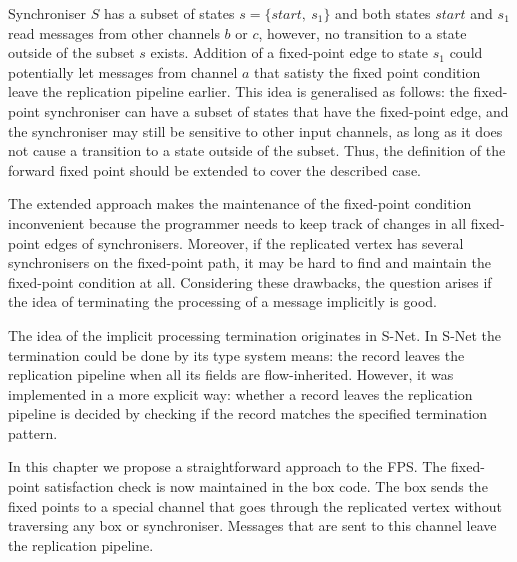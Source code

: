 Synchroniser $S$ has a subset of states $s=\{start, \: s_1\}$ and both states $start$ and $s_1$ read messages from other channels $b$ or $c$, however, no transition to a state outside of the subset $s$ exists. Addition of a fixed-point edge to state $s_1$ could potentially let messages from channel $a$ that satisty the fixed point condition leave the replication pipeline earlier. This idea is generalised as follows: the fixed-point synchroniser can have a subset of states that have the fixed-point edge, and the synchroniser may still be sensitive to other input channels, as long as it does not cause a transition to a state outside of the subset. Thus, the definition of the forward fixed point should be extended to cover the described case.

The extended approach makes the maintenance of the fixed-point condition inconvenient because the programmer needs to keep track of changes in all fixed-point edges of synchronisers. Moreover, if the replicated vertex has several synchronisers on the fixed-point path, it may be hard to find and maintain the fixed-point condition at all. Considering these drawbacks, the question arises if the idea of terminating the processing of a message implicitly is good.


The idea of the implicit processing termination originates in S-Net. In S-Net the termination could be done by its type system means: the record leaves the replication pipeline when all its fields are flow-inherited. However, it was implemented in a more explicit way: whether a record leaves the replication pipeline is decided by checking if the record matches the specified termination pattern.


In this chapter we propose a straightforward approach to the FPS. The fixed-point satisfaction check is now maintained in the box code. The box sends the fixed points to a special channel that goes through the replicated vertex without traversing any box or synchroniser. Messages that are sent to this channel leave the replication pipeline.



